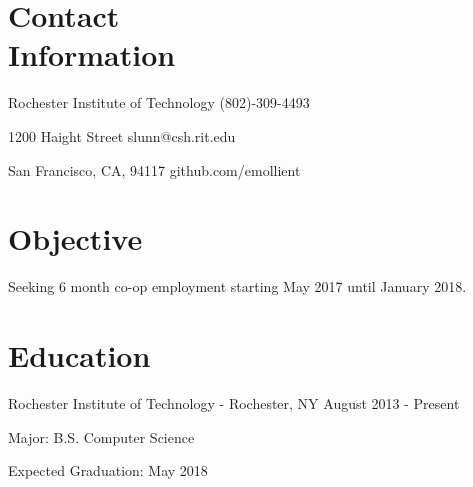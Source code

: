 \documentclass[a4paper,margin,line]{resume}
\newcommand{\rdate}[1]{\hfill {\small #1}}
\begin{document}
\begin{resume}
\section{\mysidestyle Contact \\ Information} \vspace{2mm}
	\begin{asparablank}
		\item Rochester Institute of Technology \hfill (802)-309-4493
		\item 1200 Haight Street \hfill slunn@csh.rit.edu
		\item San Francisco, CA, 94117 \hfill github.com/emollient
	\end{asparablank}

\section{\mysidestyle Objective}
	\begin{asparablank}
    	\item Seeking 6 month co-op employment starting May 2017 until January 2018.
	\end{asparablank}

\section{\mysidestyle Education}
	\begin{compactdesc}
		\item[Rochester Institute of Technology] - Rochester, NY \rdate{August 2013 - Present}
		\begin{asparablank} { \small
			\item Major: B.S. Computer Science
		} \end{asparablank}
		\begin{asparablank} { \small
			\item Expected Graduation: May 2018
		} \end{asparablank}
	\end{compactdesc}


\end{resume}
\end{document}
